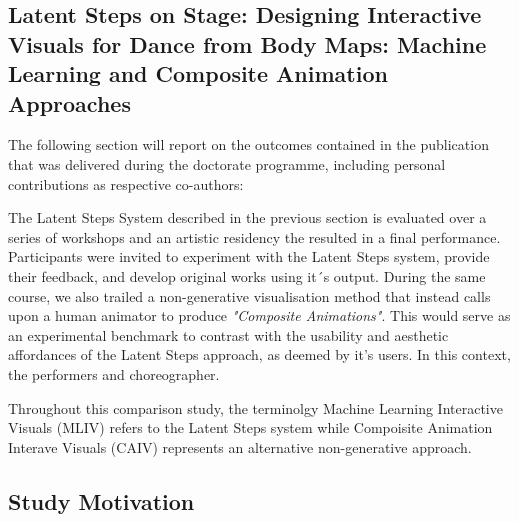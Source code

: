 \subsection[Designing Interactive Visuals from Body Maps]{Latent Steps on Stage: Designing Interactive Visuals for Dance from Body Maps: Machine Learning and Composite Animation Approaches}
\label{case_studies:modi_dis}

The following section will report on the outcomes contained in the publication that was delivered during the doctorate programme, including personal contributions as respective co-authors:


The Latent Steps System described in the previous section is evaluated over a series of workshops and an artistic residency the resulted in a final performance. Participants were invited to experiment with the Latent Steps system, provide their feedback, and develop original works using it´s output. During the same course, we also trailed a non-generative visualisation method that instead calls upon a human animator to produce \textit{"Composite Animations"}. This would serve as an experimental benchmark to contrast with the usability and aesthetic affordances of the Latent Steps approach, as deemed by it's users. In this context, the performers and choreographer.

Throughout this comparison study, the terminolgy Machine Learning Interactive Visuals (MLIV) refers to the Latent Steps system while Compoisite Animation Interave Visuals (CAIV) represents an alternative non-generative approach.

\subsection{Study Motivation}

